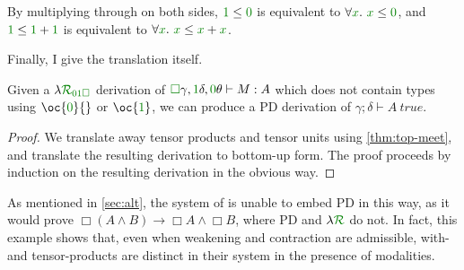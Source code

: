 \begin{remark}
  By multiplying through on both sides, $\gr1 \leq \gr0$ is equivalent to
  $\forall\gr x.~\gr x \leq \gr0$, and $\gr1 \leq \gr1 + \gr1$ is equivalent to
  $\forall\gr x.~\gr x \leq \gr x + \gr x$.
\end{remark}

Finally, I give the translation itself.

\begin{proposition}[\name{} $\to$ PD]
  Given a $\name_{\instPD}$ derivation of
  $\valid\gamma, \true\delta, \unused\theta
  \vdash M : A$ which does not contain types using $\oc{\unused}{}$ or
  $\oc{\true}$, we can produce a PD derivation of
  $\gamma; \delta \vdash A~\mathit{true}$.
\end{proposition}
\begin{proof}
  We translate away tensor products and tensor units using
  \cref{thm:top-meet}, and translate the resulting derivation to bottom-up
  form.
  The proof proceeds by induction on the resulting derivation in the obvious
  way.
\end{proof}

As mentioned in \cref{sec:alt}, the system of \citet{AbelBernardy2020}
is unable to embed PD in this way, as it would prove
$\Box(A \wedge B) \to \Box A \wedge \Box B$, where PD and $\name$ do not.
In fact, this example shows that, even when weakening and contraction are
admissible, with- and tensor-products are distinct in their system in the
presence of modalities.

